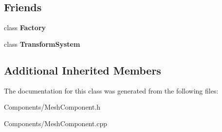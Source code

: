 \subsection*{Friends}
\begin{DoxyCompactItemize}
\item 
\mbox{\label{classMeshComponent_a328c093d609680cca505905c6d49901a}} 
class {\bfseries Factory}
\item 
\mbox{\label{classMeshComponent_a318469cfd809ba3993eb0331cba48707}} 
class {\bfseries Transform\+System}
\end{DoxyCompactItemize}
\subsection*{Additional Inherited Members}


The documentation for this class was generated from the following files\+:\begin{DoxyCompactItemize}
\item 
Components/Mesh\+Component.\+h\item 
Components/Mesh\+Component.\+cpp\end{DoxyCompactItemize}
